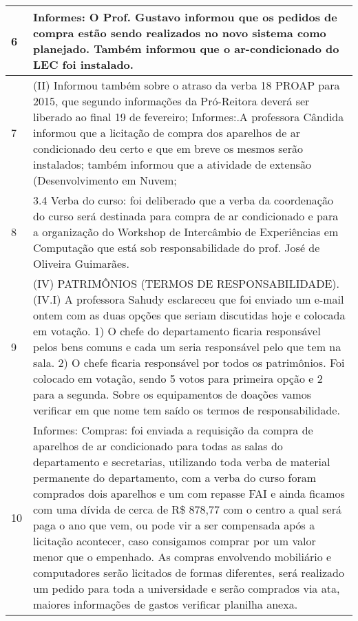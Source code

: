 \begin{longtable}{|p{0.2cm}|p{17cm}|}
 \\ \hline 
6 &
Informes: O Prof. Gustavo informou que os pedidos de compra estão sendo realizados no novo sistema como planejado. Também informou que o ar-condicionado do LEC foi instalado. 
\\ \hline 
7 &
(II) Informou também sobre o atraso da verba 18 PROAP para 2015, que segundo informações da Pró-Reitora deverá ser liberado ao final 19 de fevereiro;
Informes:.A professora Cândida informou que a licitação de compra dos aparelhos de ar condicionado deu certo e que em breve os mesmos serão instalados; também informou que a atividade de extensão (Desenvolvimento em Nuvem;
 \\ \hline 
8 &
3.4 Verba do curso: foi deliberado que a verba da coordenação do curso será destinada para compra de ar condicionado e para a organização do Workshop de Intercâmbio de Experiências em Computação que está sob responsabilidade do prof. José de Oliveira Guimarães.
 \\ \hline 
9 &
(IV) PATRIMÔNIOS (TERMOS DE RESPONSABILIDADE). (IV.I) A professora Sahudy esclareceu que foi enviado um e-mail ontem com as duas opções que seriam discutidas hoje e colocada em votação. 1) O chefe do departamento ficaria responsável pelos bens comuns e cada um seria responsável pelo que tem na sala. 2) O chefe ficaria responsável por todos os patrimônios. Foi colocado em votação, sendo 5 votos para primeira opção e 2 para a segunda. Sobre os equipamentos de doações vamos verificar em que nome tem saído os termos de responsabilidade.
 \\ \hline 
10 &
Informes: Compras: foi enviada a requisição da compra de aparelhos de ar condicionado para todas as salas do departamento e secretarias, utilizando toda verba de material permanente do departamento, com a verba do curso foram comprados dois aparelhos e um com repasse FAI e ainda ficamos com uma dívida de cerca de R\$ 878,77 com o centro a qual será paga o ano que vem, ou pode vir a ser compensada após a licitação acontecer, caso consigamos comprar por um valor menor que o empenhado. As compras envolvendo mobiliário e computadores serão licitados de formas diferentes, será realizado um pedido para toda a universidade e serão comprados via ata, maiores informações de gastos verificar planilha anexa.

 \\ \hline 

\end{longtable} 


